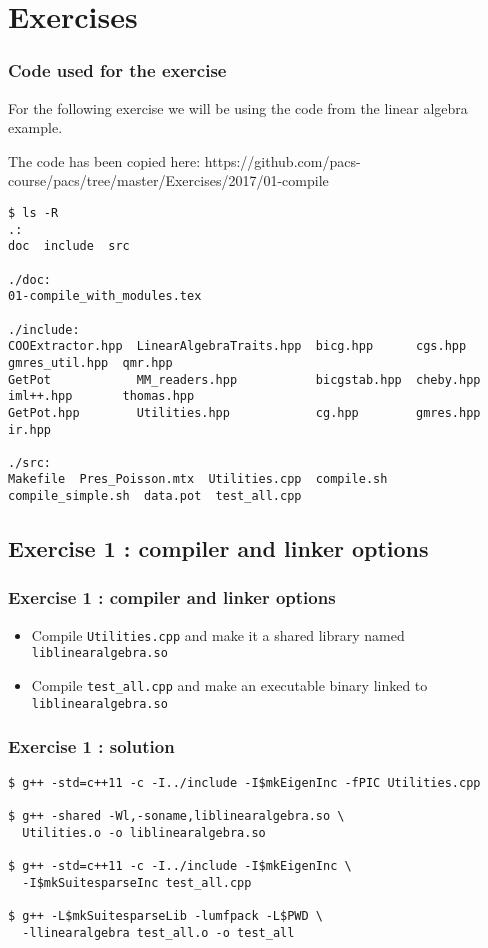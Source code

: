 \documentclass[9pt]{beamer}
\begin{document}
\section{Exercises}
\begin{frame}[fragile]
\frametitle{Code used for the exercise}

For the following exercise we will be using the code from the linear algebra example.

The code has been copied here: https://github.com/pacs-course/pacs/tree/master/Exercises/2017/01-compile

\tiny
\begin{verbatim}
$ ls -R
.:
doc  include  src

./doc:
01-compile_with_modules.tex

./include:
COOExtractor.hpp  LinearAlgebraTraits.hpp  bicg.hpp      cgs.hpp    gmres_util.hpp  qmr.hpp
GetPot            MM_readers.hpp           bicgstab.hpp  cheby.hpp  iml++.hpp       thomas.hpp
GetPot.hpp        Utilities.hpp            cg.hpp        gmres.hpp  ir.hpp

./src:
Makefile  Pres_Poisson.mtx  Utilities.cpp  compile.sh  compile_simple.sh  data.pot  test_all.cpp
\end{verbatim}

\end{frame}

\subsection{Exercise 1 : compiler and linker options}
\begin{frame}\frametitle{Exercise 1 : compiler and linker options}
\begin{itemize}
\item Compile {\tt Utilities.cpp} and make it a shared library named {\tt liblinearalgebra.so}\\[5mm]
\item Compile {\tt test\_all.cpp} and make an executable binary linked to {\tt liblinearalgebra.so}
\end{itemize}
\end{frame}

\begin{frame}[fragile]\frametitle{Exercise 1 : solution}
\begin{verbatim}
$ g++ -std=c++11 -c -I../include -I$mkEigenInc -fPIC Utilities.cpp

$ g++ -shared -Wl,-soname,liblinearalgebra.so \
  Utilities.o -o liblinearalgebra.so
  
$ g++ -std=c++11 -c -I../include -I$mkEigenInc \
  -I$mkSuitesparseInc test_all.cpp
  
$ g++ -L$mkSuitesparseLib -lumfpack -L$PWD \
  -llinearalgebra test_all.o -o test_all
  
\end{verbatim}


\end{frame}
\end{document}
